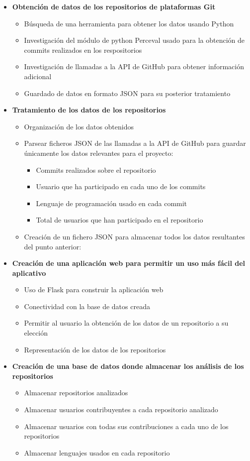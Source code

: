 \documentclass[a4paper, 12pt]{book}
\begin{document}
\begin{itemize}
  \item \textbf{Obtención de datos de los repositorios de plataformas Git}
        \begin{itemize}
  \item Búsqueda de una herramienta para obtener los datos usando Python
  \item Investigación del módulo de python Perceval usado para la obtención de commits realizados en los respositorios
  \item Investigación de llamadas a la API de GitHub para obtener información adicional
  \item Guardado de datos en formato JSON para su posterior tratamiento
\end{itemize}
\item \textbf{Tratamiento de los datos de los repositorios}
\begin{itemize}
\item Organización de los datos obtenidos
\item Parsear ficheros JSON de las llamadas a la API de GitHub para guardar únicamente los datos relevantes para el proyecto:
\begin{itemize}
  \item Commits realizados sobre el repositorio
  \item Usuario que ha participado en cada uno de los commits
  \item Lenguaje de programación usado en cada commit
  \item Total de usuarios que han participado en el repositorio
\end{itemize}
\item Creación de un fichero JSON para almacenar todos los datos resultantes del punto anterior:
\end{itemize}
\item \textbf{Creación de una aplicación web para permitir un uso más fácil del aplicativo}
\begin{itemize}
  \item Uso de Flask para construir la aplicación web
  \item Conectividad con la base de datos creada
  \item Permitir al usuario la obtención de los datos de un repositorio a su elección
  \item Representación de los datos de los repositorios
\end{itemize}
\item \textbf{Creación de una base de datos donde almacenar los análisis de los repositorios}
\begin{itemize}
  \item Almacenar repositorios analizados
  \item Almacenar usuarios contribuyentes a cada repositorio analizado
  \item Almacenar usuarios con todas sus contribuciones a cada uno de los repositorios
  \item Almacenar lenguajes usados en cada repositorio
\end{itemize}
\end{itemize}
\end{document}
